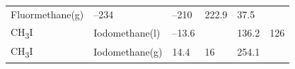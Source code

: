 \documentclass[
  9pt,
]{extbook}
\theoremstyle{definition}
\theoremstyle{definition}
\theoremstyle{definition}
\theoremstyle{remark}
\begin{document}
\begin{longtable}[]{@{}llllll@{}}
\begin{minipage}[t]{0.17\columnwidth}
Fluormethane(g)\strut
\end{minipage} & \begin{minipage}[t]{0.15\columnwidth}\raggedright
--234\strut
\end{minipage} & \begin{minipage}[t]{0.15\columnwidth}\raggedright
--210\strut
\end{minipage} & \begin{minipage}[t]{0.14\columnwidth}\raggedright
222.9\strut
\end{minipage} & \begin{minipage}[t]{0.14\columnwidth}\raggedright
37.5\strut
\end{minipage}\tabularnewline
\begin{minipage}[t]{0.07\columnwidth}\raggedright
CH\textsubscript{3}I\strut
\end{minipage} & \begin{minipage}[t]{0.17\columnwidth}\raggedright
Iodomethane(l)\strut
\end{minipage} & \begin{minipage}[t]{0.15\columnwidth}\raggedright
--13.6\strut
\end{minipage} & \begin{minipage}[t]{0.15\columnwidth}\raggedright
\strut
\end{minipage} & \begin{minipage}[t]{0.14\columnwidth}\raggedright
136.2\strut
\end{minipage} & \begin{minipage}[t]{0.14\columnwidth}\raggedright
126\strut
\end{minipage}\tabularnewline
\begin{minipage}[t]{0.07\columnwidth}\raggedright
CH\textsubscript{3}I\strut
\end{minipage} & \begin{minipage}[t]{0.17\columnwidth}\raggedright
Iodomethane(g)\strut
\end{minipage} & \begin{minipage}[t]{0.15\columnwidth}\raggedright
14.4\strut
\end{minipage} & \begin{minipage}[t]{0.15\columnwidth}\raggedright
16\strut
\end{minipage} & \begin{minipage}[t]{0.14\columnwidth}\raggedright
254.1\strut
\end{minipage} & \begin{minipage}[t]{0.14\columnwidth}\raggedright

\end{minipage}
\end{longtable}
\end{document}
